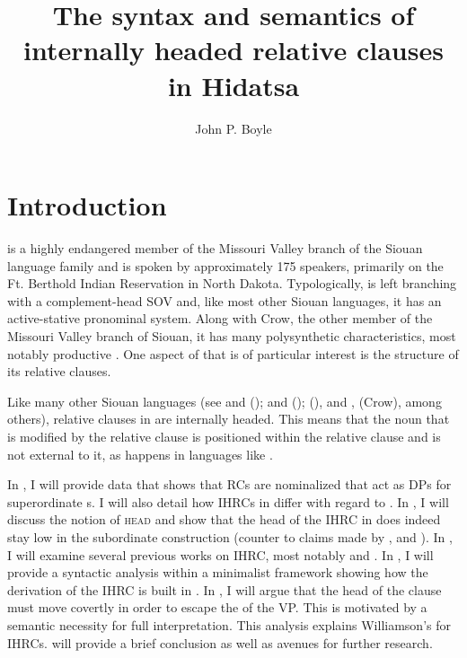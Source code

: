 \documentclass[output=paper]{LSP/langsci}
\author{John P. Boyle}
\title{The syntax and semantics of internally headed relative clauses in {Hidatsa}}
\begin{document}
\section{Introduction}  
\largerpage[-2]
 is a highly endangered member of the Missouri Valley branch of the Siouan language family and is spoken by approximately 175 speakers, primarily on the Ft. Berthold Indian Reservation in North Dakota. Typologically,  is left branching with a complement-head SOV  and, like most other Siouan languages, it has an active-stative pronominal system. Along with Crow, the other member of the Missouri Valley branch of Siouan, it has many polysynthetic characteristics, most notably productive  \citep{Rankinetal2003, Boyle2007}. One aspect of  that is of particular interest is the structure of its relative clauses.
	
Like many other Siouan languages (see \citealt{Drummond1976} and \citealt{Cumberland2005} (); \citealt{Williamson1987} and \citealt{RoodTaylor1996} (); \citealt{Quintero2004} (), and \citealt{Graczyk1991b}, \citeyear{Graczyk2007} (Crow), among others), relative clauses in  are internally headed. This means that the noun that is modified by the relative clause is positioned within the relative clause and is not external to it, as happens in languages like .
	
In , I will provide data that shows that  RCs are nominalized  that act as DPs for superordinate s. I will also detail how IHRCs in  differ with regard to . In , I will discuss the notion of \textsc{head} and show that the head of the IHRC in  does indeed stay low in the subordinate construction (counter to claims made by \citealt{Kayne1994}, \citealt{Bianchi1999} and \citealt{DiSciullo2005}). In , I will examine several previous works on IHRC, most notably \citet{Williamson1987} and \citet{Culy1990}. In , I will provide a syntactic analysis within a minimalist framework showing how the derivation of the IHRC is built in . In , I will argue that the head of the clause must move covertly in order to escape the  of the VP. This is motivated by a semantic necessity for full interpretation. This analysis explains Williamson's  for IHRCs.  will provide a brief conclusion as well as avenues for further research.
\end{document}
